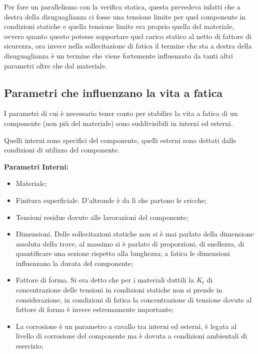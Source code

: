 		  Per fare un parallelismo con la verifica statica, questa prevedeva infatti che a destra della disuguaglianza ci fosse una tensione limite per quel componente in condizioni statiche e quella tensione limite era proprio quella del materiale, ovvero quanto questo potesse sopportare quel carico statico al netto di fattore di sicurezza, ora invece nella sollecitazione di fatica il termine che sta a destra della disuguaglianza è un termine che viene fortemente influenzato da tanti altri parametri oltre che dal materiale. 
		  
		  
\subsection{Parametri che influenzano la vita a fatica  }		  
		  I parametri di cui è necessario tener conto per stabilire la vita a fatica di un componente (non più del materiale) sono suddivisibili in interni ed esterni. 
		  
		  Quelli interni sono specifici del componente, quelli esterni sono dettati dalle condizioni di utilizzo del componente. \newline
 			
 		  \textbf{Parametri Interni:} 
 		  \begin{itemize}
 		  	\item Materiale;
 		  	\item Finitura superficiale. D'altronde è da lì che partono le cricche; 
 		  	\item Tensioni residue dovute alle lavorazioni del componente;
 		  	\item Dimensioni. Delle sollecitazioni statiche non si è mai parlato della dimensione assoluta della trave, al massimo si è parlato di proporzioni, di snellezza, di quantificare una sezione rispetto alla lunghezza; a fatica le dimensioni influenzano la durata del componente;
 		  	\item Fattore di forma. Si era detto che per i materiali duttili la $K_t$ di concentrazione delle tensioni in condizioni statiche non si prende in considerazione, in condizioni di fatica la concentrazione di tensione dovute al fattore di forma è invece estremamente importante;
 		  	\item La corrosione è un parametro a cavallo tra interni ed esterni, è legata al livello di corrosione del componente ma è dovuta a condizioni ambientali di esercizio;
 		  \end{itemize}
 		  
